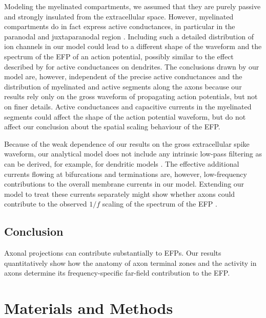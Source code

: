 \documentclass[]{elife}
\begin{document}
Modeling the myelinated compartments, we assumed that they are purely
passive and strongly insulated from the extracellular space. However,
myelinated compartments do in fact express active conductances, in
particular in the paranodal and juxtaparanodal region
\citep{Chiu1981Evidence, Waxman1985Organization}. Including such a
detailed distribution of ion channels in our model could lead to a
different shape of the waveform and the spectrum of the EFP of an action
potential, possibly similar to the effect described by
\citet{Ness2016Active} for active conductances on dendrites. The
conclusions drawn by our model are, however, independent of the precise
active conductances and the distribution of myelinated and active
segments along the axons because our results rely only on the gross
waveform of propagating action potentials, but not on finer details.
Active conductances and capacitive currents in the myelinated segments
could affect the shape of the action potential waveform, but do not
affect our conclusion about the spatial scaling behaviour of the EFP.

Because of the weak dependence of our results on the gross extracellular
spike waveform, our analytical model does not include any intrinsic
low-pass filtering as can be derived, for example, for dendritic models
\citetext{\citealp{Linden2010Intrinsic}; \citealp{Einevoll2013Modelling}; \citealp[for
reviews see][]{Buzsaki2012Origin}}. The effective additional currents
flowing at bifurcations and terminations are, however, low-frequency
contributions to the overall membrane currents in our model. Extending
our model to treat these currents separately might show whether axons
could contribute to the observed \(1/f\) scaling of the spectrum of the
EFP \citep{Pritchard1992Brain}.

\subsection{Conclusion}\label{conclusion}

Axonal projections can contribute substantially to EFPs. Our results
quantitatively show how the anatomy of axon terminal zones and the
activity in axons determine its frequency-specific far-field
contribution to the EFP.

\section{Materials and Methods}\label{materials-and-methods}
\end{document}
